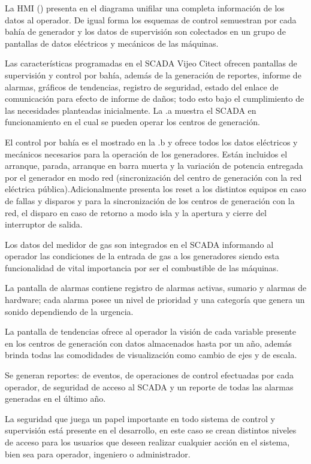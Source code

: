 
La HMI () presenta en el diagrama unifilar una completa información de los datos al operador. De igual forma los esquemas de control semuestran por cada bahía de generador y los datos de supervisión son colectados en un grupo de pantallas de datos eléctricos y mecánicos de las máquinas.

Las características programadas en el SCADA Vijeo Citect ofrecen pantallas de supervisión y control por bahía, además de la generación de reportes, informe de alarmas, gráficos de tendencias, registro de seguridad, estado del enlace de comunicación para efecto de informe de daños; todo esto bajo el cumplimiento de las necesidades planteadas inicialmente. La .a muestra el SCADA en funcionamiento en el cual se pueden operar los centros de generación.

El control por bahía es el  mostrado en la .b y ofrece todos los datos eléctricos y mecánicos necesarios para la operación de los generadores. Están incluidos el arranque, parada, arranque en barra muerta y la variación de potencia entregada por el generador en modo red (sincronización del centro de generación con la red eléctrica pública).Adicionalmente presenta los reset a los distintos equipos en caso de fallas y disparos y para la sincronización de los centros de generación con la red, el disparo en caso de retorno a modo isla y la apertura y cierre del interruptor de salida.

Los datos del medidor de gas son integrados en el SCADA informando al operador las condiciones de la entrada de gas a los generadores siendo esta funcionalidad de vital importancia por ser el combustible de las máquinas.

La pantalla de alarmas contiene registro de alarmas activas, sumario y alarmas de hardware; cada alarma posee un nivel de prioridad y una categoría que genera un sonido dependiendo de la urgencia.

La pantalla de tendencias ofrece al operador la visión de cada variable presente en los centros de generación con datos almacenados hasta por un año, además brinda todas las comodidades de visualización como cambio de ejes y de escala.

Se generan reportes: de eventos, de operaciones de control efectuadas por cada operador, de seguridad de acceso al SCADA y un reporte de todas las alarmas generadas en el último año.

La seguridad que juega un papel importante en todo sistema de control y supervisión está presente en el desarrollo, en este caso se crean distintos niveles de acceso para los usuarios que deseen realizar cualquier acción en el sistema, bien sea para operador, ingeniero o administrador.

